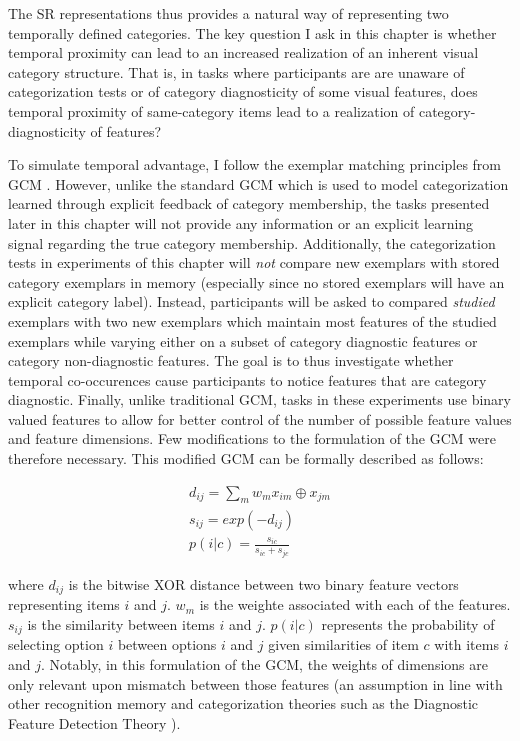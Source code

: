 The SR representations thus provides a natural way of representing two temporally defined categories. The key question I ask in this chapter is whether temporal proximity can lead to an increased realization of an inherent visual category structure. That is, in tasks where participants are are unaware of categorization tests or of category diagnosticity of some visual features, does temporal proximity of same-category items lead to a realization of category-diagnosticity of features?

To simulate temporal advantage, I follow the exemplar matching principles from GCM \cite{nosofsky1994comparing,rouder2004comparing,nosofsky2011generalized,nosofsky1986attention}. However, unlike the standard GCM which is used to model categorization learned through explicit feedback of category membership, the tasks presented later in this chapter will not provide any information or an explicit learning signal regarding the true category membership. Additionally, the categorization tests in experiments of this chapter will \textit{not} compare new exemplars with stored category exemplars in memory (especially since no stored exemplars will have an explicit category label). Instead, participants will be asked to compared \textit{studied} exemplars with two new exemplars which maintain most features of the studied exemplars while varying either on a subset of category diagnostic features or category non-diagnostic features. The goal is to thus investigate whether temporal co-occurences cause participants to notice features that are category diagnostic. Finally, unlike traditional GCM, tasks in these experiments use binary valued features to allow for better control of the number of possible feature values and feature dimensions. Few modifications to the formulation of the GCM were therefore necessary. This modified GCM can be formally described as follows:

\begin{equation}
    \begin{aligned}
        d_{ij} = \sum_{m} w_m x_{im} \oplus x_{jm} \\
        s_{ij} = exp(-d_{ij}) \\ 
        p(i|c) = \frac{s_{ic}}{s_{ic} + s_{jc}} 
    \end{aligned}
\end{equation}

where $d_{ij}$ is the bitwise XOR distance between two binary feature vectors representing items $i$ and $j$. $w_m$ is the weighte associated with each of the features. $s_{ij}$ is the similarity between items $i$ and $j$. $p(i|c)$ represents the probability of selecting option $i$ between options $i$ and $j$ given similarities of item $c$ with items $i$ and $j$. Notably, in this formulation of the GCM, the weights of dimensions are only relevant upon mismatch between those features (an assumption in line with other recognition memory and categorization theories such as the Diagnostic Feature Detection Theory \cite{wixted2014signal}).


